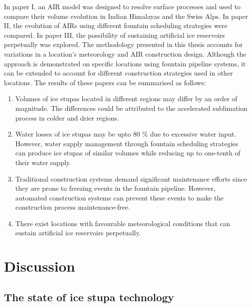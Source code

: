 In paper I, an AIR model was designed to resolve surface processes and used to compare their volume evolution in
Indian Himalayas and the Swiss Alps. In paper II, the evolution of AIRs using different fountain scheduling
strategies were compared. In paper III, the possibility of sustaining artificial ice reservoirs perpetually was
explored. The methodology presented in this thesis accounts for variations in a location's meteorology and AIR
construction design. Although the approach is demonstrated on specific locations using fountain pipeline
systems, it can be extended to account for different construction strategies used in other locations. The
results of these papers can be summarised as follows:

\begin{enumerate}

	\item Volumes of ice stupas located in different regions may differ by an order of magnitude. The differences
	      could be attributed to the accelerated sublimation process in colder and drier regions.

	\item Water losses of ice stupas may be upto 80 \% due to excessive water input. However, water supply
	      management through fountain scheduling strategies can produce ice stupas of similar volumes while reducing up to
	      one-tenth of their water supply.

	\item Traditional construction systems demand significant maintenance efforts since they are prone to freezing
	      events in the fountain pipeline. However, automated construction systems can prevent these events to make the
	      construction process maintenance-free.

	\item There exist locations with favourable meteorological conditions that can sustain artificial ice reservoirs
	      perpetually.

\end{enumerate}


\section{Discussion}

\subsection{The state of ice stupa technology}

